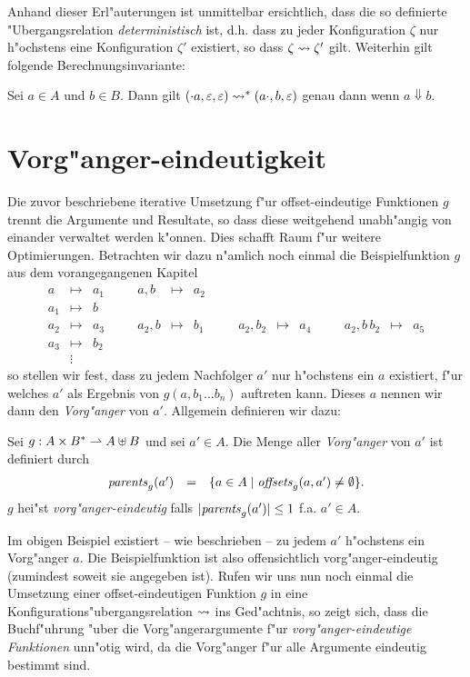 \documentclass[12pt,a4paper]{article}
\begin{document}
Anhand dieser Erl"auterungen ist unmittelbar ersichtlich, dass die so definierte "Ubergangsrelation
\emph{deterministisch} ist, d.h. dass zu jeder Konfiguration $\zeta$ nur h"ochstens eine Konfiguration
$\zeta'$ existiert, so dass $\zeta \rightsquigarrow \zeta'$ gilt. Weiterhin gilt folgende Berechnungsinvariante:
\begin{lemma}
  Sei $a \in A$ und $b \in B$. Dann gilt
  $(\cdot a,\varepsilon,\varepsilon) \rightsquigarrow^* (a \cdot, b, \varepsilon)$
  genau dann wenn $a \Downarrow b$.
\end{lemma}


\section{Vorg"anger-eindeutigkeit}

Die zuvor beschriebene iterative Umsetzung f"ur offset-eindeutige Funktionen $g$ trennt die Argumente
und Resultate, so dass diese weitgehend unabh"angig von einander verwaltet werden k"onnen. Dies schafft
Raum f"ur weitere Optimierungen. Betrachten wir dazu n"amlich noch einmal die Beispielfunktion $g$ aus
dem vorangegangenen Kapitel
\[\begin{array}{lclclclclcllclc}
  a &\mapsto& a_1 &\quad& a,b &\mapsto& a_2 &\quad& && &\quad& \\
  a_1 &\mapsto& b \\
  a_2 &\mapsto& a_3 && a_2,b &\mapsto& b_1 && a_2,b_2 &\mapsto& a_4 && a_2,b\,b_2 &\mapsto& a_5 \\
  a_3 &\mapsto& b_2 \\
  &\vdots&
\end{array}\]
so stellen wir fest, dass zu jedem Nachfolger $a'$ nur h"ochstens ein $a$ existiert, f"ur welches
$a'$ als Ergebnis von $g(a,b_1 \ldots b_n)$ auftreten kann. Dieses $a$ nennen wir dann den
\emph{Vorg"anger} von $a'$. Allgemein definieren wir dazu:

\begin{definition}
  Sei $g: A \times B^* \rightharpoonup A \uplus B$ und sei $a'\in A$. Die Menge aller \emph{Vorg"anger} von
  $a'$ ist definiert durch
  \[\begin{array}{rcl}
    \mathit{parents}_g(a') &=& \{a \in A \mid \mathit{offsets}_g(a,a') \ne \emptyset \}.
  \end{array}\]
  $g$ hei"st \emph{vorg"anger-eindeutig} falls $|\mathit{parents}_g(a')| \le 1$ f.a. $a' \in A$.
\end{definition}

Im obigen Beispiel existiert -- wie beschrieben -- zu jedem $a'$ h"ochstens ein Vorg"anger $a$.
Die Beispielfunktion ist also offensichtlich vorg"anger-eindeutig (zumindest soweit sie angegeben
ist). Rufen wir uns nun noch einmal die Umsetzung einer offset-eindeutigen Funktion $g$ in eine
Konfigurations"ubergangsrelation $\rightsquigarrow$ ins Ged"achtnis, so zeigt sich, dass die Buchf"uhrung
"uber die Vorg"angerargumente f"ur \emph{vorg"anger-eindeutige Funktionen} unn"otig wird, da
die Vorg"anger f"ur alle Argumente eindeutig bestimmt sind.
\end{document}

